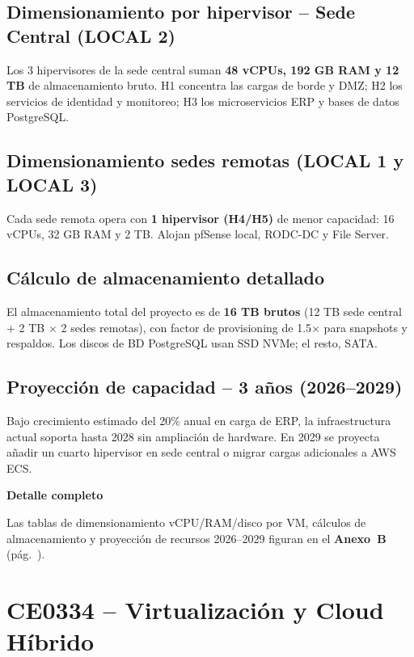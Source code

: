 \documentclass[11pt, a4paper, oneside]{report}
\newenvironment{notabox}[1]{%
  \begin{lrbox}{\notaboxsb}%
  \begin{minipage}{\dimexpr\textwidth-2\fboxsep\relax}%
  \vspace{4pt}\textcolor{upeu_dark}{\textbf{#1}}\\[2pt]\small%
}{%
  \vspace{4pt}%
  \end{minipage}%
  \end{lrbox}%
  \vspace{6pt}\par\noindent\colorbox{upeu_light}{\usebox{\notaboxsb}}\par\vspace{6pt}%
}
\begin{document}
\section{Dimensionamiento por hipervisor -- Sede Central (LOCAL 2)}

Los 3 hipervisores de la sede central suman \textbf{48 vCPUs, 192 GB RAM y 12 TB} de almacenamiento bruto. H1 concentra las cargas de borde y DMZ; H2 los servicios de identidad y monitoreo; H3 los microservicios ERP y bases de datos PostgreSQL.

\section{Dimensionamiento sedes remotas (LOCAL 1 y LOCAL 3)}

Cada sede remota opera con \textbf{1 hipervisor (H4/H5)} de menor capacidad: 16 vCPUs, 32 GB RAM y 2 TB. Alojan pfSense local, RODC-DC y File Server.

\section{Cálculo de almacenamiento detallado}

El almacenamiento total del proyecto es de \textbf{16 TB brutos} (12 TB sede central + 2 TB $\times$ 2 sedes remotas), con factor de provisioning de 1.5$\times$ para snapshots y respaldos. Los discos de BD PostgreSQL usan SSD NVMe; el resto, SATA.

\section{Proyección de capacidad -- 3 años (2026--2029)}

Bajo crecimiento estimado del 20\% anual en carga de ERP, la infraestructura actual soporta hasta 2028 sin ampliación de hardware. En 2029 se proyecta añadir un cuarto hipervisor en sede central o migrar cargas adicionales a AWS ECS.

\begin{notabox}{Detalle completo}
Las tablas de dimensionamiento vCPU/RAM/disco por VM, cálculos de almacenamiento y proyección de recursos 2026--2029 figuran en el \textbf{Anexo~B} (pág.~\pageref{anex:dimensionamiento}).
\end{notabox}
\chapter{CE0334 -- Virtualización y Cloud Híbrido}
\end{document}
